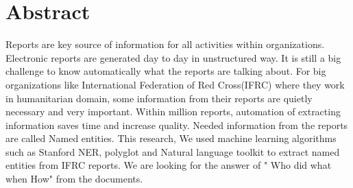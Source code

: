 \chapter*{Abstract} 

Reports are key source of information for all activities within  organizations. Electronic reports are generated day to day in unstructured way. It is still a big challenge to know automatically what the reports are talking about.  For big organizations like International Federation of Red Cross(IFRC) where they work in humanitarian domain, some information from their reports are quietly necessary and very important. Within million reports, automation of extracting information saves time and increase quality. Needed information from the reports are called Named entities. This research, We used machine learning algorithms such as Stanford NER, polyglot and Natural language toolkit  to extract named entities from IFRC reports. We are looking for the answer of " Who did what when How" from the documents. 

